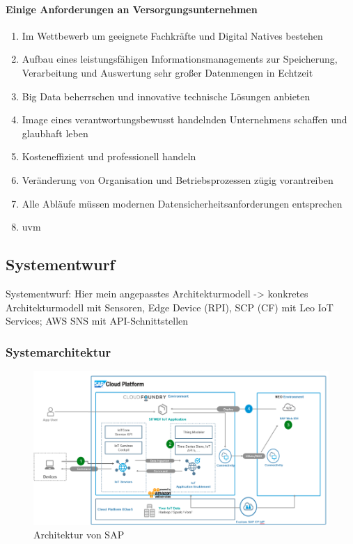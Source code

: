 \paragraph{Einige Anforderungen an Versorgungsunternehmen}
\begin{enumerate}
  \item Im Wettbewerb um geeignete Fachkräfte und Digital Natives bestehen
  \item Aufbau eines leistungsfähigen Informationsmanagements zur Speicherung, Verarbeitung und Auswertung sehr großer Datenmengen in Echtzeit
  \item Big Data beherrschen und innovative technische Lösungen anbieten
  \item Image eines verantwortungsbewusst handelnden Unternehmens schaffen und glaubhaft leben
  \item Kosteneffizient und professionell handeln
  \item Veränderung von Organisation und Betriebsprozessen zügig vorantreiben
  \item Alle Abläufe müssen modernen Datensicherheitsanforderungen entsprechen
  \item uvm
\end{enumerate}


\subsection{Systementwurf}
Systementwurf: Hier mein angepasstes Architekturmodell -> konkretes Architekturmodell mit Sensoren, Edge Device (RPI), SCP (CF) mit Leo IoT Services; AWS SNS mit API-Schnittstellen

\subsubsection{Systemarchitektur}
\begin{figure}[H]
    \centering
    \includegraphics[width=1.0\linewidth]{pictures/sap_architecture}
    \caption[Referenzarchitektur von SAP]{Architektur von SAP \citep{Ganz2019}}
    \label{fig:filename_without_extension}
\end{figure}


